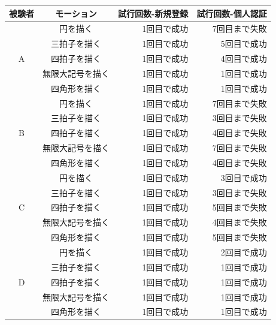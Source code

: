 \documentclass[11pt]{jreport}
\begin{document}
        \begin{center}
            \begin{longtable}{|c|c|r|r|}
            \hline
                被験者 & モーション & 試行回数-新規登録 & 試行回数-個人認証 \\ \hline \hline \endhead
                  & 円を描く & 1回目で成功 & 7回目まで失敗 \\ \cline{2-4} %
                  & 三拍子を描く & 1回目で成功 & 5回目で成功 \\ \cline{2-4}
                A & 四拍子を描く & 1回目で成功 & 4回目で成功 \\ \cline{2-4}
                  & 無限大記号を描く & 1回目で成功 & 1回目で成功 \\ \cline{2-4}
                  & 四角形を描く & 1回目で成功 & 1回目で成功 \\ \hline %
                  & 円を描く & 1回目で成功 & 7回目まで失敗 \\ \cline{2-4} %
                  & 三拍子を描く & 1回目で成功 & 3回目まで失敗 \\ \cline{2-4}
                B & 四拍子を描く & 1回目で成功 & 4回目まで失敗 \\ \cline{2-4}
                  & 無限大記号を描く & 1回目で成功 & 7回目まで失敗 \\ \cline{2-4}
                  & 四角形を描く & 1回目で成功 & 4回目まで失敗 \\ \hline %
                  & 円を描く & 1回目で成功 & 3回目で成功 \\ \cline{2-4} %
                  & 三拍子を描く & 1回目で成功 & 3回目まで失敗 \\ \cline{2-4}
                C & 四拍子を描く & 1回目で成功 & 5回目まで失敗 \\ \cline{2-4}
                  & 無限大記号を描く & 1回目で成功 & 4回目まで失敗 \\ \cline{2-4}
                  & 四角形を描く & 1回目で成功 & 5回目まで失敗 \\ \hline %
                  & 円を描く & 1回目で成功 & 2回目で成功 \\ \cline{2-4} %
                  & 三拍子を描く & 1回目で成功 & 1回目で成功 \\ \cline{2-4}
                D & 四拍子を描く & 1回目で成功 & 1回目で成功 \\ \cline{2-4}
                  & 無限大記号を描く & 1回目で成功 & 1回目で成功 \\ \cline{2-4}
                  & 四角形を描く & 1回目で成功 & 1回目で成功 \\ \hline %

\end{longtable}
\end{center}
\end{document}
